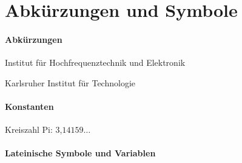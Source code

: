 \chapter*{Abkürzungen und Symbole}
\label{cha:Abkuerzungen_Symbole}


\subsubsection*{Abkürzungen}
\begin{description}[leftmargin=\widthof{\textbf{XXXXXXX}\hspace{\labelsep}},style=nextline]
	\item[$\mathbf{IHE}$] Institut f\"ur Hochfrequenztechnik und Elektronik
	\item[$\mathbf{KIT}$] Karlsruher Institut f\"ur Technologie
\end{description}


\subsubsection*{Konstanten}
\begin{description}[leftmargin=\widthof{\textbf{XXXXXXX}\hspace{\labelsep}},style=nextline]
	\item[$\pi$] Kreiszahl Pi: $3$,$14159\ldots$
\end{description}


\subsubsection*{Lateinische Symbole und Variablen}

